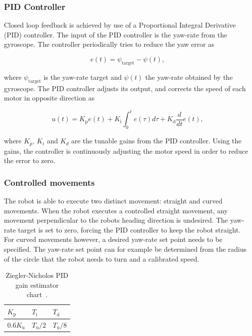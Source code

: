 \subsubsection{PID Controller}


Closed loop feedback is achieved by use of a Proportional Integral Derivative (PID) controller.
The input of the PID controller is the yaw-rate from the gyroscope.
The controller periodically tries to reduce the yaw error as

\begin{equation}
	e(t) = \psi_{\text{target}} - \psi(t),
\end{equation}

\noindent
where $\psi_{\text{target}}$ is the yaw-rate target and $\psi(t)$ the yaw-rate obtained by the gyroscope.
The PID controller adjusts its output, and corrects the speed of each motor in opposite direction as

\begin{equation}
u(t) = K_{\text{p}}e(t) + K_{\text{i}} \int_{0}^{t}e(\tau)d\tau + K_{\text{d}}\frac{d}{dt}e(t),
\end{equation}

\noindent
where $K_{p}$, $K_{i}$ and $K_{d}$ are the tunable gains from the PID controller.
Using the gains, the controller is continuously adjusting the motor speed in order to reduce the error to zero.

\subsubsection{Controlled movements}

The robot is able to execute two distinct movement: straight and curved movements.
When the robot executes a controlled straight movement, any movement perpendicular to the robots heading direction is undesired.
The yaw-rate target is set to zero, forcing the PID controller to keep the robot straight.
For curved movements however, a desired yaw-rate set point needs to be specified.
The yaw-rate set point can for example be determined from the radius of the circle that the robot needs to turn and a calibrated speed.

\begin{table}[t]
	\centering
	\caption{Ziegler-Nicholos PID gain estimator chart~\cite{franklin_feedback_2015}.}
	\label{tab:gain_chart}
	\begin{tabular}{|l|l|l|} 
		\hline
		$K_{\text{p}}$ & $T_{\text{i}}$ & $T_{\text{d}}$ \\
		\hline \hline
		0.6$K_{\text{u}}$ & $T_{\text{u}}/2$ & $T_{\text{u}}/8$ \\
		\hline
	\end{tabular}
\end{table}

